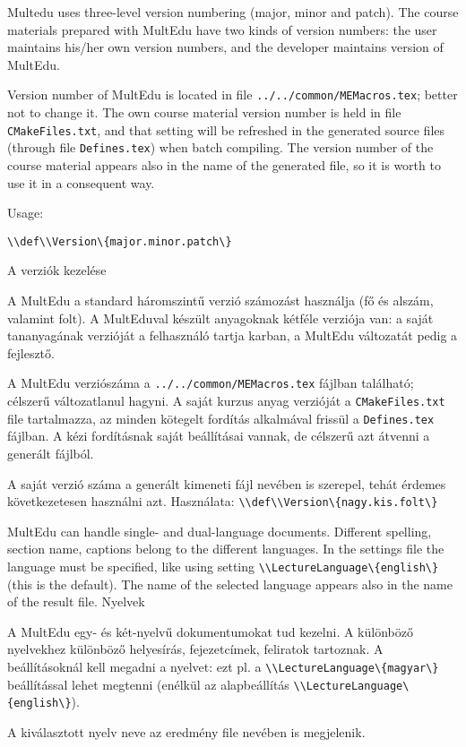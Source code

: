 {
Multedu uses three-level version numbering (major, minor and patch).
The course materials prepared with \gls{MultEdu} have two kinds of version numbers: the user maintains his/her own version numbers, and the 
developer maintains version of \gls{MultEdu}. 

Version number of \gls{MultEdu} is located in file  \lstinline|../../common/MEMacros.tex|; better not to change it.
The own course material version number is held in file \lstinline|CMakeFiles.txt|, and that setting will be refreshed 
in the generated source files (through file \lstinline|Defines.tex|) when batch compiling.
The version number of the course material appears also in the name
of the generated file, so it is worth to use it in a consequent way.

Usage:
\par\noindent\lstinline|\\def\\Version\{major.minor.patch\}|
}
{A verziók kezelése}
{
A \gls{MultEdu} a standard háromszintű verzió számozást használja (fő és alszám, valamint folt). A \gls{MultEdu}val készült anyagoknak kétféle 
verziója van: a saját tananyagának verzióját a felhasználó tartja karban, a \gls{MultEdu} változatát pedig a fejlesztő.

A \gls{MultEdu} verziószáma a \lstinline|../../common/MEMacros.tex| fájlban található; célszerű változatlanul hagyni. 
A saját kurzus anyag verzióját a \lstinline|CMakeFiles.txt| file tartalmazza, az minden kötegelt fordítás alkalmával frissül a
\lstinline|Defines.tex| fájlban. A kézi fordításnak saját beállításai vannak, de célszerű azt átvenni a generált fájlból.

A saját verzió száma a generált kimeneti fájl nevében is szerepel,
tehát érdemes következetesen használni azt. Használata:
\lstinline|\\def\\Version\{nagy.kis.folt\}|
}


{
\gls{MultEdu} can handle single- and dual-language documents.
Different spelling, section name, captions belong to the different languages. In the settings file the language must be specified,
like using setting \lstinline|\\LectureLanguage\{english\}| (this is the default).
The name of the selected language appears also in the name of the result file.
}
{Nyelvek}
{
A \gls{MultEdu} egy- és két-nyelvű dokumentumokat tud kezelni.
A különböző nyelvekhez különböző helyesírás, fejezetcímek, feliratok tartoznak. A beállításoknál kell megadni a nyelvet: ezt pl. a \lstinline|\\LectureLanguage\{magyar\}| beállítással lehet megtenni
(enélkül az alapbeállítás \lstinline|\\LectureLanguage\{english\}|).

A kiválasztott nyelv neve az eredmény file nevében is megjelenik.
}

